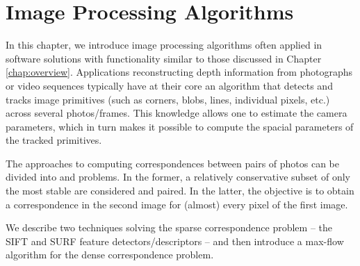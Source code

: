 
\chapter{Image Processing Algorithms}
\label{chap:algorithms}

In this chapter, we introduce image processing algorithms often applied in software solutions with functionality similar to those discussed in Chapter \ref{chap:overview}. %
Applications reconstructing depth information from photographs or video sequences typically have at their core an algorithm that detects and tracks image primitives (such as corners, blobs, lines, individual pixels, etc.) across several photos/frames. 
This knowledge allows one to estimate the camera parameters, which in turn makes it possible to compute the spacial parameters of the tracked primitives.

The approaches to computing correspondences between pairs of photos can be divided into  and  problems. %
In the former, a relatively conservative subset of only the most stable  are considered and paired. %
In the latter, the objective is to obtain a correspondence in the second image for (almost) every pixel of the first image. 

We describe two techniques solving the sparse correspondence problem -- the SIFT \cite{lowe1999} and SURF \cite{surf2006} feature detectors/descriptors -- and then introduce a max-flow algorithm \cite{roy1999} for the dense correspondence problem. 

